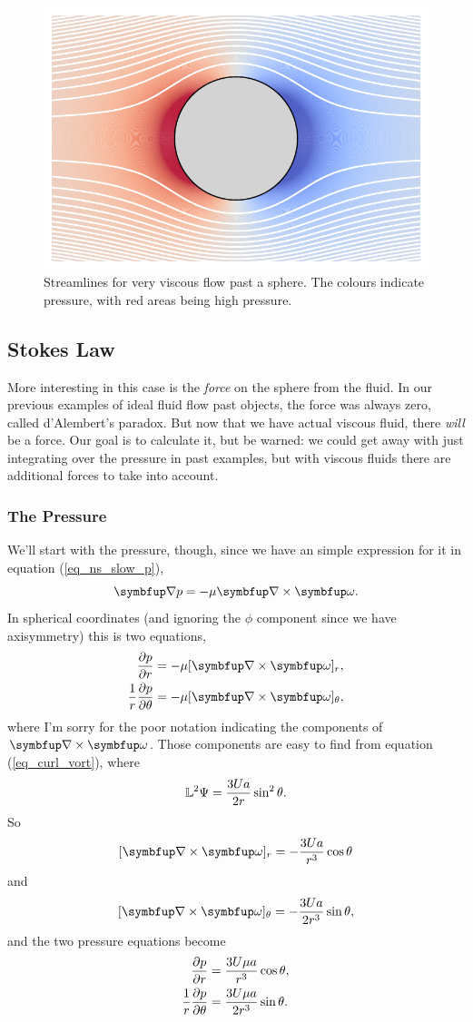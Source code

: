 \begin{figure}
\centering
\includegraphics[width=0.8\linewidth]{Figures/Chapter6/fig_sphere_viscous_lines}
\caption{Streamlines for very viscous flow past a sphere.  The colours indicate pressure, with red areas being high pressure.}
\label{fig_sphere_viscous_lines}
\end{figure}

\subsection{Stokes Law}

More interesting in this case is the \emph{force} on the sphere from the fluid.  In our previous examples of ideal fluid flow past objects, the force was always zero, called d'Alembert's paradox.  But now that we have actual viscous fluid, there \emph{will} be a force.  Our goal is to calculate it, but be warned:  we could get away with just integrating over the pressure in past examples, but with viscous fluids there are additional forces to take into account.

\subsubsection{The Pressure}

We'll start with the pressure, though, since we have an simple expression for it in equation (\ref{eq_ns_slow_p}),
\[
\grad p = -\mu \grad \times \vec{\omega}.
\]
In spherical coordinates (and ignoring the $\phi$ component since we have axisymmetry) this is two equations,
\begin{align}
\dfdx{p}{r} & = -\mu [\grad \times \vec{\omega}]_r, \\
\frac{1}{r}\dfdx{p}{\theta} & = -\mu [\grad \times \vec{\omega}]_\theta,
\end{align}
where I'm sorry for the poor notation indicating the components of $\grad \times \vec{\omega}$.  Those components are easy to find from equation (\ref{eq_curl_vort}), where
\[
\mathbb{L}^2 \Psi = \frac{3Ua}{2r} \sin^2\theta.
\]
So 
\[
[\grad \times \vec{\omega}]_r = -\frac{3Ua}{r^3} \cos\theta
\]
and
\[
[\grad \times \vec{\omega}]_\theta = -\frac{3Ua}{2r^3} \sin\theta,
\]
and the two pressure equations become
\begin{align}
\frac{\partial {p}}{\partial {r}} & =  \frac{3U\mu a}{r^3} \cos\theta, \\
\frac{1}{r}\frac{\partial {p}}{\partial {\theta}} & = \frac{3U\mu a}{2r^3} \sin\theta.
\end{align}


